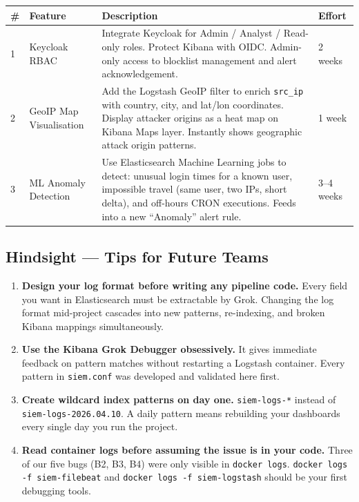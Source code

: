 \documentclass[12pt,a4paper]{article}
\newcommand{\file}[1]{\texttt{\color{accent}#1}}
\newcommand{\field}[1]{\texttt{#1}}
\begin{document}
\begin{center}
\begin{tabular}{p{0.4cm}p{3.8cm}p{7.5cm}p{1.8cm}}
  \toprule
  \textbf{\#} & \textbf{Feature} & \textbf{Description} & \textbf{Effort} \\
  \midrule
  1 & Keycloak RBAC &
    Integrate Keycloak for Admin / Analyst / Read-only roles.
    Protect Kibana with OIDC. Admin-only access to blocklist management
    and alert acknowledgement.
    & 2 weeks \\
  \midrule
  2 & GeoIP Map Visualisation &
    Add the Logstash GeoIP filter to enrich \field{src\_ip} with country,
    city, and lat/lon coordinates. Display attacker origins as a heat map
    on Kibana Maps layer. Instantly shows geographic attack origin patterns.
    & 1 week \\
  \midrule
  3 & ML Anomaly Detection &
    Use Elasticsearch Machine Learning jobs to detect: unusual login times
    for a known user, impossible travel (same user, two IPs, short delta),
    and off-hours CRON executions. Feeds into a new ``Anomaly'' alert rule.
    & 3--4 weeks \\
  \bottomrule
\end{tabular}
\end{center}

\subsection{Hindsight — Tips for Future Teams}

\begin{enumerate}[leftmargin=2em]
  \item \textbf{Design your log format before writing any pipeline code.}
        Every field you want in Elasticsearch must be extractable by Grok.
        Changing the log format mid-project cascades into new patterns,
        re-indexing, and broken Kibana mappings simultaneously.
  \item \textbf{Use the Kibana Grok Debugger obsessively.}
        It gives immediate feedback on pattern matches without restarting a
        Logstash container. Every pattern in \file{siem.conf} was developed
        and validated here first.
  \item \textbf{Create wildcard index patterns on day one.}
        \texttt{siem-logs-*} instead of \texttt{siem-logs-2026.04.10}.
        A daily pattern means rebuilding your dashboards every single day
        you run the project.
  \item \textbf{Read container logs before assuming the issue is in your code.}
        Three of our five bugs (B2, B3, B4) were only visible in
        \texttt{docker logs}. \texttt{docker logs -f siem-filebeat} and
        \texttt{docker logs -f siem-logstash} should be your first debugging
        tools.
\end{enumerate}
\end{document}

